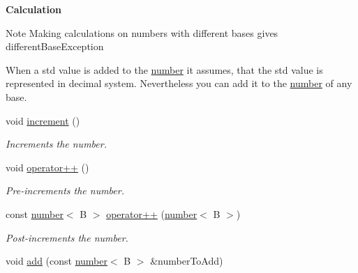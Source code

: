 \begin{Indent}{\bf Calculation}\par
{\em \begin{DoxyNote}{Note}
Making calculations on numbers with different bases gives different\-Base\-Exception 

When a std value is added to the \hyperlink{classcjr_1_1number}{number} it assumes, that the std value is represented in decimal system. Nevertheless you can add it to the \hyperlink{classcjr_1_1number}{number} of any base. 
\end{DoxyNote}
}\begin{DoxyCompactItemize}
\item 
\hypertarget{classcjr_1_1number_a314f5ddd4ea8b6e0ff752d9ca8f00a2a}{void \hyperlink{classcjr_1_1number_a314f5ddd4ea8b6e0ff752d9ca8f00a2a}{increment} ()}\label{classcjr_1_1number_a314f5ddd4ea8b6e0ff752d9ca8f00a2a}

\begin{DoxyCompactList}\small\item\em Increments the number. \end{DoxyCompactList}\item 
\hypertarget{classcjr_1_1number_af50a7633da47b4003ae722138717ecce}{void \hyperlink{classcjr_1_1number_af50a7633da47b4003ae722138717ecce}{operator++} ()}\label{classcjr_1_1number_af50a7633da47b4003ae722138717ecce}

\begin{DoxyCompactList}\small\item\em Pre-\/increments the number. \end{DoxyCompactList}\item 
\hypertarget{classcjr_1_1number_a418523b5c0dff677e0303998909056ba}{const \hyperlink{classcjr_1_1number}{number}$<$ B $>$ \hyperlink{classcjr_1_1number_a418523b5c0dff677e0303998909056ba}{operator++} (\hyperlink{classcjr_1_1number}{number}$<$ B $>$)}\label{classcjr_1_1number_a418523b5c0dff677e0303998909056ba}

\begin{DoxyCompactList}\small\item\em Post-\/increments the number. \end{DoxyCompactList}\item 
\hypertarget{classcjr_1_1number_ac876a5bc8916d2ddb19a1d514ac3f5c0}{void \hyperlink{classcjr_1_1number_ac876a5bc8916d2ddb19a1d514ac3f5c0}{add} (const \hyperlink{classcjr_1_1number}{number}$<$ B $>$ \&number\-To\-Add)}\label{classcjr_1_1number_ac876a5bc8916d2ddb19a1d514ac3f5c0}


\end{DoxyCompactItemize}
\end{Indent}
